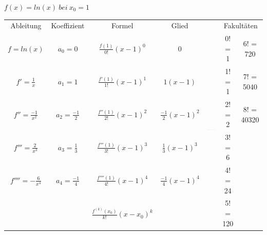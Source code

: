 $f(x)=ln(x)\: bei\: x_{0}=1$

\begin{tabular}{|c|c|c|c|c|c|c|}
\cline{1-4} \cline{6-7} 
Ableitung & Koeffizient & Formel & Glied &  & \multicolumn{2}{c|}{Fakultäten}\tabularnewline
\cline{1-4} \cline{6-7} 
$f=ln(x)$  & $a_{0}=0$ & $\frac{f(1)}{0!}(x-1)^{0}$ & 0 & \multirow{6}{*}{\includegraphics[height=1cm]{potenzreihen/wolfr1}} & 0! = 1 & 6! = 720\tabularnewline
\cline{1-4} \cline{6-7} 
$f'=\frac{1}{x}$ & $a_{1}=1$ & $\frac{f'(1)}{1!}(x-1)^{1}$ & $1(x-1)$ &  & 1! = 1 & 7! = 5040\tabularnewline
\cline{1-4} \cline{6-7} 
$f''=\frac{-1}{x^{2}}$ & $a_{2}=\frac{-1}{2}$ & $\frac{f''(1)}{2!}(x-1)^{2}$ & $\frac{-1}{2}(x-1)^{2}$ &  & 2! = 2 & 8! = 40320\tabularnewline
\cline{1-4} \cline{6-7} 
$f'''=\frac{2}{x^{3}}$ & $a_{3}=\frac{1}{3}$ & $\frac{f'''(1)}{3!}(x-1)^{3}$ & $\frac{1}{3}(x-1)^{3}$ &  & 3! = 6 & \tabularnewline
\cline{1-4} \cline{6-7} 
$f''''=-\frac{6}{x^{4}}$ & $a_{4}=\frac{-1}{4}$ & $\frac{f''''(1)}{4!}(x-1)^{4}$ & $\frac{-1}{4}(x-1)^{4}$ &  & 4! = 24 & \tabularnewline
\cline{1-4} \cline{6-7} 
 &  & $\frac{f^{(k)}(x_{0})}{k!}(x-x_{0})^{k}$ &  &  & 5! = 120 & \tabularnewline
\cline{1-4} \cline{6-7} 
\end{tabular}
